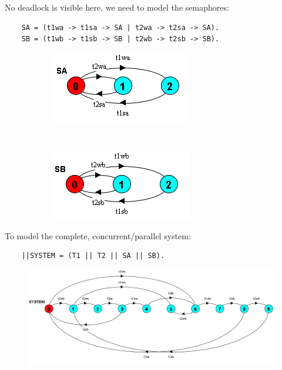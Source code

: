 No deadlock is visible here, we need to model the semaphores:
\begin{verbatim}
    SA = (t1wa -> t1sa -> SA | t2wa -> t2sa -> SA).
    SB = (t1wb -> t1sb -> SB | t2wb -> t2sb -> SB).
\end{verbatim}
\begin{figure}[H]
\centering
\begin{subfigure}{.5\textwidth}
\centering
\includegraphics[width=.9\linewidth]{figures/Modeling concurrent programs/Example1/SA.PNG}
\end{subfigure}%
~
\begin{subfigure}{.5\textwidth}
\centering
\includegraphics[width=.9\linewidth]{figures/Modeling concurrent programs/Example1/SB.PNG}
\end{subfigure}
\end{figure}
To model the complete, concurrent/parallel system:
\begin{verbatim}
    ||SYSTEM = (T1 || T2 || SA || SB).
\end{verbatim}
\begin{figure}[H]
    \centering
    \includegraphics[width=\linewidth]{figures/Modeling concurrent programs/Example1/SYSTEM.PNG}
\end{figure}

